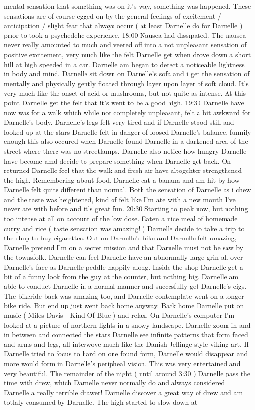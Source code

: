 \documentclass[12pt]{book}
\begin{document}
mental sensation that something was on it's way, something was happened. These sensations are of course egged on by the general feelings of excitement / anticipation / slight fear that always occur ( at least Darnelle do for Darnelle ) prior to took a psychedelic experience. 18:00 Nausea had dissipated. The nausea never really amounted to much and veered off into a not unpleasant sensation of positive excitement, very much like the felt Darnelle get when drove down a short hill at high speeded in a car. Darnelle am began to detect a noticeable lightness in body and mind. Darnelle sit down on Darnelle's sofa and i get the sensation of mentally and physically gently floated through layer upon layer of soft cloud. It's very much like the onset of acid or mushrooms, but not quite as intense. At this point Darnelle get the felt that it's went to be a good high. 19:30 Darnelle have now was for a walk which while not completely unpleasant, felt a bit awkward for Darnelle's body. Darnelle's legs felt very tired and if Darnelle stood still and looked up at the stars Darnelle felt in danger of loosed Darnelle's balance, funnily enough this also occured when Darnelle found Darnelle in a darkened area of the street where there was no streetlamps. Darnelle also notice how hungry Darnelle have become amd decide to prepare something when Darnelle get back. On returned Darnelle feel that the walk and fresh air have altogehter strengthened the high. Remembering about food, Darnelle eat a banana and am hit by how Darnelle felt quite different than normal. Both the sensation of Darnelle as i chew and the taste was heightened, kind of felt like I'm ate with a new mouth I've never ate with before and it's great fun. 20:30 Starting to peak now, but nothing too intense at all on account of the low dose. Eaten a nice meal of homemade curry and rice ( taste sensation was amazing! ) Darnelle decide to take a trip to the shop to buy cigarettes. Out on Darnelle's bike and Darnelle felt amazing, Darnelle pretend I'm on a secret mission and that Darnelle must not be saw by the townsfolk. Darnelle can feel Darnelle have an abnormally large grin all over Darnelle's face as Darnelle peddle happily along. Inside the shop Darnelle get a bit of a funny look from the guy at the counter, but nothing big. Darnelle am able to conduct Darnelle in a normal manner and succesfully get Darnelle's cigs. The bikeride back was amazing too, and Darnelle contemplate went on a longer bike ride. But end up just went back home anyway. Back home Darnelle put on music ( Miles Davis - Kind Of Blue ) and relax. On Darnelle's computer I'm looked at a picture of northern lights in a snowy landscape. Darnelle zoom in and in between and connected the stars Darnelle see infinite patterns that form faced and arms and legs, all interwove much like the Danish Jellinge style viking art. If Darnelle tried to focus to hard on one found form, Darnelle would disappear and more would form in Darnelle's peripheal vision. This was very entertained and very beautiful. The remainder of the night ( until around 3:30 ) Darnelle pass the time with drew, which Darnelle never normally do and always considered Darnelle a really terrible drawer! Darnelle discover a great way of drew and am totlaly consumed by Darnelle. The high started to slow down at 
\end{document}
